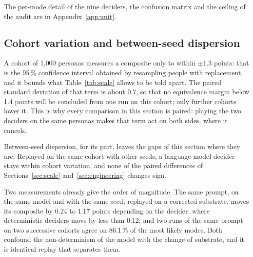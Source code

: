 
The per-mode detail of the nine deciders, the confusion matrix and the ceiling of the audit are in Appendix~\ref{app:unit}.

\subsection{Cohort variation and between-seed dispersion}
\label{sec:dispersion}

A cohort of 1{,}000 personas measures a composite only to within $\pm 1.3$ points: that is the 95\,\% confidence interval obtained by resampling people with replacement, and it bounds what Table~\ref{tab:scale} allows to be told apart. The paired standard deviation of that term is about 0.7, so that no equivalence margin below 1.4 points will be concluded from one run on this cohort; only further cohorts lower it. This is why every comparison in this section is paired: playing the two deciders on the same personas makes that term act on both sides, where it cancels.

Between-seed dispersion, for its part, leaves the gaps of this section where they are. Replayed on the same cohort with other seeds, a language-model decider stays within cohort variation, and none of the paired differences of Sections~\ref{sec:scale} and~\ref{sec:engineering} changes sign.


Two measurements already give the order of magnitude. The same prompt, on the same model and with the same seed, replayed on a corrected substrate, moves its composite by 0.24 to 1.17 points depending on the decider, where deterministic deciders move by less than 0.12; and two runs of the same prompt on two successive cohorts agree on 86.1\,\% of the most likely modes. Both confound the non-determinism of the model with the change of substrate, and it is identical replay that separates them.


